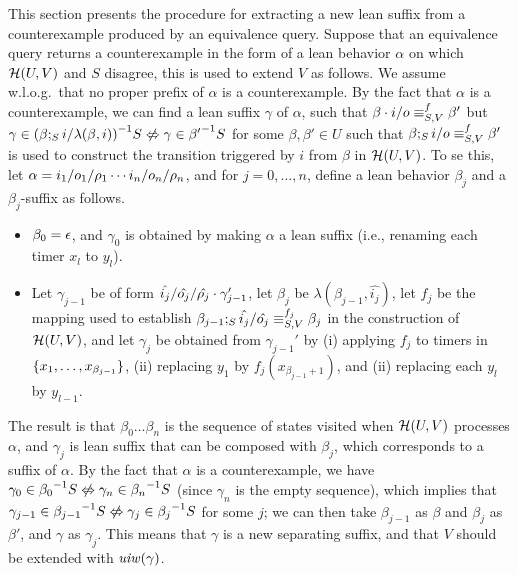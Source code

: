 This section presents the procedure for extracting a new lean suffix
from a counterexample produced by an equivalence query.
Suppose that an equivalence query returns a counterexample in the form of a lean behavior
$\alpha$ on which $\mathcal{H}(U,V)$ and $S$ disagree,
this is used to extend $V$ as follows.
We assume w.l.o.g.\ that no proper prefix of $\alpha$ is a counterexample. 
By the fact that $\alpha$ is a counterexample, we can find a lean
suffix $\gamma$ of $\alpha$, such that
$\beta\cdot i/o \equiv_{S,V}^f \beta'$ but
$\gamma \in \suffixbehs{S}{(\extend{\beta}{i}{\lambda(\beta,i)})}
\smallnotiff \gamma \in \suffixbehs{S}{\beta'}$
for some $\beta,\beta' \in U$ such that 
$\beta;_{S}i/o \equiv_{S,V}^f \beta'$ is used to construct
the transition triggered by $i$ from $\beta$ in $\mathcal{H}(U,V)$.
To se this, let $\alpha = i_1/o_1/\rho_1 \cdots i_n/o_n/\rho_n$, and for $j = 0 , \ldots, n$, define
a lean behavior $\beta_j$ and a $\beta_j$-suffix as follows.
\begin{itemize}
\item $\beta_0 = \epsilon$, and
  $\gamma_0$ is obtained by making $\alpha$ a lean suffix (i.e.,
  renaming each timer $x_l$ to $y_l$).
\item
  Let $\gamma_{j-1}$ be of form
  $\hat{i_j}/\hat{o_j}/\hat{\rho_j} \cdot \gamma_{j-1}'$,
  let $\beta_j$ be $\lambda(\beta_{j-1},\hat{i_j})$,
  let $f_j$ be the mapping used to establish
  $\beta_{j-1};_{S}\hat{i_j}/\hat{o_j} \equiv_{S,V}^{f_j} \beta_{j}$
  in the construction of $\mathcal{H}(U,V)$,
  and let $\gamma_j$ be obtained from $\gamma_{j-1}'$ by
  (i) applying $f_j$ to timers in $\lbrace x_1, \ldots , x_{\beta_{j-1}}\rbrace$,
  (ii) replacing $y_1$ by $f_j(x_{\beta_{j-1}+1})$, and
  (ii) replacing each $y_l$ by $y_{l-1}$.
\end{itemize}
The result is that
$\beta_0 \ldots \beta_n$ is the sequence of states 
visited when $\mathcal{H}(U,V)$ processes $\alpha$, and
$\gamma_j$ is lean suffix that can be composed with $\beta_j$,
which corresponds to a suffix of $\alpha$.
By the fact that $\alpha$ is a counterexample, we have
$\gamma_0 \in\suffixbehs{S}{\beta_0} \smallnotiff \gamma_n \in\suffixbehs{S}{\beta_n}$ (since $\gamma_n$ is the empty sequence), which implies that
$\gamma_{j-1} \in\suffixbehs{S}{\beta_{j-1}}
\smallnotiff
\gamma_{j} \in\suffixbehs{S}{\beta_{j}}$
for some $j$;
we can then take $\beta_{j-1}$ as $\beta$ and $\beta_j$ as $\beta'$, and
$\gamma$ as $\gamma_j$.
This means that $\gamma$ is a new separating suffix, and that $V$ should be
extended with $\mathit{uiw}(\gamma)$.

